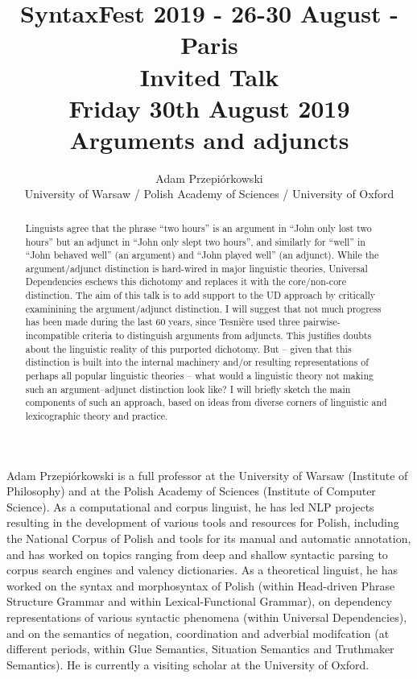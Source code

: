 \documentclass[11pt]{article}
\title{{\footnotesize SyntaxFest 2019 - 26-30 August - Paris}\\
\vspace{10mm}
 Invited Talk\\
  {\small Friday 30th August 2019}\\
  Arguments and adjuncts}
\author{Adam Przepiórkowski\\
  University of Warsaw / Polish Academy of Sciences / University of Oxford}
\begin{document}
\maketitle
\begin{abstract}
Linguists agree that the phrase “two hours” is an argument in “John only lost two hours” but an adjunct in “John only slept two hours”, and similarly for “well” in “John behaved well” (an argument) and “John played well” (an adjunct). While the argument/adjunct distinction is hard-wired in major linguistic theories, Universal Dependencies eschews this dichotomy and replaces it with the core/non-core distinction. The aim of this talk is to add support to the UD approach by critically examinining the argument/adjunct distinction. I will suggest that not much progress has been made during the last 60 years, since Tesnière used three pairwise-incompatible criteria to distinguish arguments from adjuncts. This justifies doubts about the linguistic reality of this purported dichotomy. But – given that this distinction is built into the internal machinery and/or resulting representations of perhaps all popular linguistic theories – what would a linguistic theory not making such an argument–adjunct distinction look like? I will briefly sketch the main components of such an approach, based on ideas from diverse corners of linguistic and lexicographic theory and practice.
\end{abstract}

\vspace{4mm}
\begin{shortbio}
  Adam Przepiórkowski is a full professor at the University of Warsaw (Institute of Philosophy) and at the Polish Academy of Sciences (Institute of Computer Science). As a computational and corpus linguist, he has led NLP projects resulting in the development of various tools and resources for Polish, including the National Corpus of Polish and tools for its manual and automatic annotation, and has worked on topics ranging from deep and shallow syntactic parsing to corpus search engines and valency dictionaries. As a theoretical linguist, he has worked on the syntax and morphosyntax of Polish (within Head-driven Phrase Structure Grammar and within Lexical-Functional Grammar), on dependency representations of various syntactic phenomena (within Universal Dependencies), and on the semantics of negation, coordination and adverbial modifcation (at different periods, within Glue Semantics, Situation Semantics and Truthmaker Semantics). He is currently a visiting scholar at the University of Oxford.
  
\end{shortbio}
\end{document}
